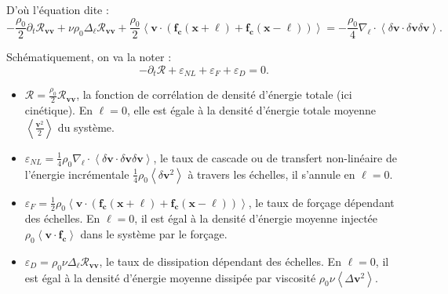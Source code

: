 D'où l'équation dite : 
\begin{equation}
    - \frac{\rho_0}{2} \partial_t \mathcal{R}_{\boldsymbol{v}\boldsymbol{v}} + \nu \rho_0 \Delta_{\boldsymbol{\ell}} \mathcal{R}_{\boldsymbol{v}\boldsymbol{v}} + \frac{\rho_0}{2} \left<\boldsymbol{v} \cdot \left(\boldsymbol{f_c}\left(\mathbf{x}+\boldsymbol{\ell}\right) +  \boldsymbol{f_c}\left(\mathbf{x}-\boldsymbol{\ell}\right)\right)\right> = - \frac{\rho_0}{4} \nabla_{\boldsymbol{\ell}} \cdot \left<\delta \boldsymbol{v} \cdot \delta \boldsymbol{v} \delta \boldsymbol{v}\right> \label{eq:KHM_HD}  
.\end{equation} 

Schématiquement, on va la noter : 
\begin{equation}
    \label{eq:bal_KHM} -\partial_t \mathcal{R} + \varepsilon_{NL} + \varepsilon_{F} + \varepsilon_{D} = 0 .
\end{equation} 
\begin{itemize}
    \item $\mathcal{R} = \frac{\rho_0}{2} \mathcal{R}_{\boldsymbol{v}\boldsymbol{v}}$, la fonction de corrélation de densité d'énergie totale (ici cinétique). En $\boldsymbol{\ell} = 0$, elle est égale à la densité d'énergie totale moyenne $\left<\frac{\boldsymbol{v}^2}{2}\right>$ du système.
    \item $\varepsilon_{NL} = \frac{1}{4} \rho_0 \nabla_{\boldsymbol{\ell}} \cdot \left<\delta \boldsymbol{v} \cdot \delta \boldsymbol{v} \delta \boldsymbol{v}\right>$, le taux de cascade ou de transfert non-linéaire de l'énergie incrémentale $\frac{1}{4} \rho_0 \left<\delta \boldsymbol{v}^2\right>$ à travers les échelles, il s'annule en $\boldsymbol{\ell} = 0$.
    \item $\varepsilon_{F} = \frac{1}{2} \rho_0 \left<\boldsymbol{v} \cdot \left(\boldsymbol{f_c}\left(\mathbf{x}+\boldsymbol{\ell}\right) +  \boldsymbol{f_c}\left(\mathbf{x}-\boldsymbol{\ell}\right)\right)\right>$, le taux de forçage dépendant des échelles. En $\boldsymbol{\ell} = 0$, il est égal à la densité d'énergie moyenne injectée $\rho_0 \left<\boldsymbol{v} \cdot  \boldsymbol{f_c}\right>$ dans le système par le forçage.
    \item $\varepsilon_{D} = \rho_0 \nu \Delta_{\boldsymbol{\ell}} \mathcal{R}_{\boldsymbol{v}\boldsymbol{v}}$, le taux de dissipation dépendant des échelles. En $\boldsymbol{\ell} = 0$, il est égal à la densité d'énergie moyenne dissipée par viscosité $\rho_0 \nu \left<\Delta \boldsymbol{v}^2\right>$.
\end{itemize}

